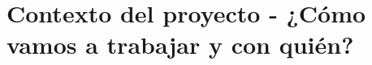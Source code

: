 \clearpage
\section{Contexto del proyecto - ¿Cómo vamos a trabajar y con quién?}\label{sec:spmp-8}




